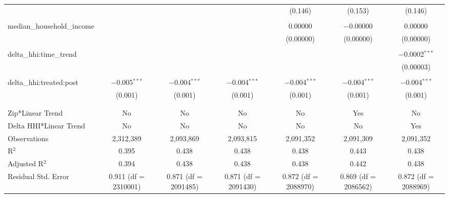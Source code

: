 \begin{table}[H]
{\begin{tabular}{@{\extracolsep{5pt}}lcccccc}
   &  &  &  & (0.146) & (0.153) & (0.146) \\  

   & & & & & & \\  

  median\_household\_income &  &  &  & 0.00000 & $-$0.00000 & 0.00000 \\  

   &  &  &  & (0.00000) & (0.00000) & (0.00000) \\  

   & & & & & & \\  

  delta\_hhi:time\_trend &  &  &  &  &  & $-$0.0002$^{***}$ \\  

   &  &  &  &  &  & (0.00003) \\  

   & & & & & & \\  

  delta\_hhi:treated:post & $-$0.005$^{***}$ & $-$0.004$^{***}$ & $-$0.004$^{***}$ & $-$0.004$^{***}$ & $-$0.004$^{***}$ & $-$0.004$^{***}$ \\  

   & (0.001) & (0.001) & (0.001) & (0.001) & (0.001) & (0.001) \\  

   & & & & & & \\  

 \hline \\[-1.8ex]  

 Zip*Linear Trend & No & No & No & No & Yes & No \\  

 Delta HHI*Linear Trend & No & No & No & No & No & Yes \\  

 Observations & 2,312,389 & 2,093,869 & 2,093,815 & 2,091,352 & 2,091,309 & 2,091,352 \\  

 R$^{2}$ & 0.395 & 0.438 & 0.438 & 0.438 & 0.443 & 0.438 \\  

 Adjusted R$^{2}$ & 0.394 & 0.438 & 0.438 & 0.438 & 0.442 & 0.438 \\  

 Residual Std. Error & 0.911 (df = 2310001) & 0.871 (df = 2091485) & 0.871 (df = 2091430) & 0.872 (df = 2088970) & 0.869 (df = 2086562) & 0.872 (df = 2088969) \\  

 \hline  


\end{tabular}}
\end{table}
